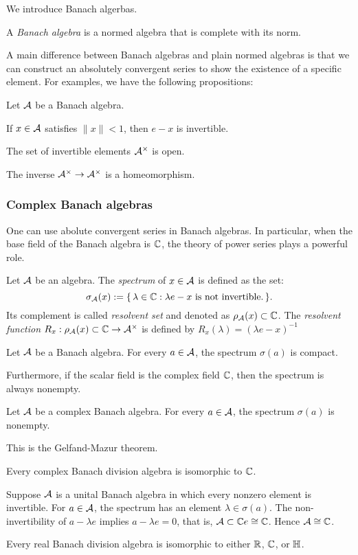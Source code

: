 \documentclass{../crs}
\begin{document}
We introduce Banach algerbas.
\begin{defn}
A \emph{Banach algebra} is a normed algebra that is complete with its norm.
\end{defn}
A main difference between Banach algebras and plain normed algebras is that we can construct an absolutely convergent series to show the existence of a specific element.
For examples, we have the following propositions:
\begin{prop}
Let $\mathcal{A}$ be a Banach algebra.
\begin{cond}
\item If $x\in\mathcal{A}$ satisfies $\|x\|<1$, then $e-x$ is invertible.
\item The set of invertible elements $\mathcal{A}^\times$ is open.
\item The inverse $\cA^\times\to\cA^\times$ is a homeomorphism.
\end{cond}
\end{prop}


\subsubsection{Complex Banach algebras}

One can use abolute convergent series in Banach algebras.
In particular, when the base field of the Banach algebra is $\mathbb{C}$, the theory of power series plays a powerful role.
\begin{defn}
Let $\mathcal{A}$ be an algebra.
The \emph{spectrum} of $x\in\mathcal{A}$ is defined as the set:
\[\sigma_{\mathcal{A}}(x):=\{\,\lambda\in\mathbb{C}:\lambda e-x\text{ is not invertible.}\,\}.\]
Its complement is called \emph{resolvent set} and denoted as $\rho_{\mathcal{A}}(x)\subset\mathbb{C}$.
The \emph{resolvent function} $R_x:\rho_\cA(x)\subset\C\to\cA^\times$ is defined by $R_x(\lambda)=(\lambda e-x)^{-1}$
\end{defn}
\begin{thm}
Let $\mathcal{A}$ be a Banach algebra.
For every $a\in\mathcal{A}$, the spectrum $\sigma(a)$ is compact.
\end{thm}
Furthermore, if the scalar field is the complex field $\mathbb{C}$, then the spectrum is always nonempty.
\begin{thm}
Let $\mathcal{A}$ be a complex Banach algebra.
For every $a\in\mathcal{A}$, the spectrum $\sigma(a)$ is nonempty.
\end{thm}

This is the Gelfand-Mazur theorem.
\begin{thm}
Every complex Banach division algebra is isomorphic to $\mathbb{C}$.
\end{thm}
\begin{pf}
Suppose $\mathcal{A}$ is a unital Banach algebra in which every nonzero element is invertible.
For $a\in\mathcal{A}$, the spectrum has an element $\lambda\in\sigma(a)$.
The non-invertibility of $a-\lambda e$ implies $a-\lambda e=0$, that is, $\mathcal{A}\subset\mathbb{C} e\cong\mathbb{C}$.
Hence $\mathcal{A}\cong\mathbb{C}$.
\end{pf}
\begin{thm}
Every real Banach division algebra is isomorphic to either $\mathbb{R}$, $\mathbb{C}$, or $\H$.
\end{thm}
\end{document}
